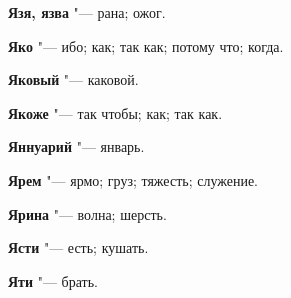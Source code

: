 \begin{mymulticols}{2}
\noindent\textbf{Язя, язва} "--- рана; ожог. 




\noindent\textbf{Яко} "--- ибо; как; так как; потому что; когда. 




\noindent\textbf{Яковый} "--- каковой. 




\noindent\textbf{Якоже} "--- так чтобы; как; так как. 




\noindent\textbf{Яннуарий} "--- январь. 




\noindent\textbf{Ярем} "--- ярмо; груз; тяжесть; служение. 




\noindent\textbf{Ярина} "--- волна; шерсть. 




\noindent\textbf{Ясти} "--- есть; кушать. 




\noindent\textbf{Яти} "--- брать. 
\normalfont\end{mymulticols}
\mychapterending


 

